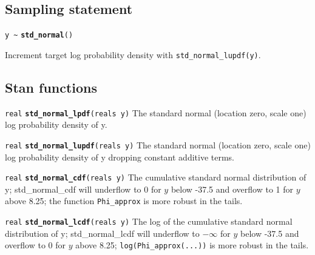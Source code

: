\documentclass[
  10pt,
]{book}
\begin{document}
\hypertarget{sampling-statement-23}{%
\subsection{Sampling statement}\label{sampling-statement-23}}

\texttt{y\ \textasciitilde{}} \textbf{\texttt{std\_normal}}\texttt{()}

Increment target log probability density with \texttt{std\_normal\_lupdf(y)}.

\hypertarget{stan-functions-22}{%
\subsection{Stan functions}\label{stan-functions-22}}


\texttt{real} \textbf{\texttt{std\_normal\_lpdf}}\texttt{(reals\ y)}\newline
The standard normal (location zero, scale one) log probability density
of y.


\texttt{real} \textbf{\texttt{std\_normal\_lupdf}}\texttt{(reals\ y)}\newline
The standard normal (location zero, scale one) log probability density
of y dropping constant additive terms.


\texttt{real} \textbf{\texttt{std\_normal\_cdf}}\texttt{(reals\ y)}\newline
The cumulative standard normal distribution of y; std\_normal\_cdf will
underflow to 0 for \(y\) below -37.5 and overflow to 1 for \(y\) above 8.25;
the function \texttt{Phi\_approx} is more robust in the tails.


\texttt{real} \textbf{\texttt{std\_normal\_lcdf}}\texttt{(reals\ y)}\newline
The log of the cumulative standard normal distribution of y; std\_normal\_lcdf
will underflow to \(-\infty\) for \(y\) below -37.5 and overflow to 0 for \(y\)
above 8.25; \texttt{log(Phi\_approx(...))} is more robust in the tails.
\end{document}
